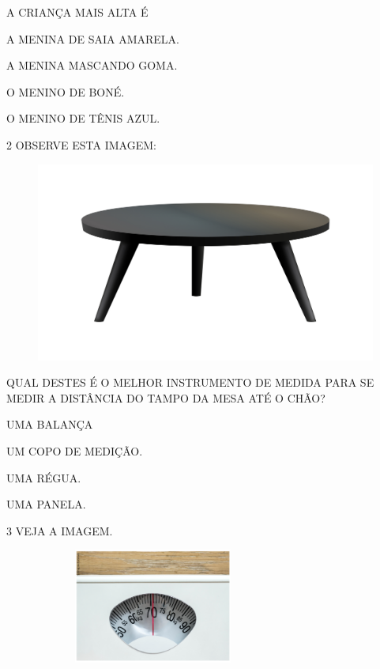 A CRIANÇA MAIS ALTA É

\begin{escolha}
\item A MENINA DE SAIA AMARELA.

\item A MENINA MASCANDO GOMA.

\item O MENINO DE BONÉ.

\item O MENINO DE TÊNIS AZUL.
\end{escolha}

\pagebreak
\num{2} OBSERVE ESTA IMAGEM:

\begin{figure}[htpb!]
\centering
\includegraphics[width=.4\textwidth]{media/image32b.jpg}
\end{figure}

QUAL DESTES É O MELHOR INSTRUMENTO DE MEDIDA PARA SE MEDIR A DISTÂNCIA DO TAMPO DA MESA ATÉ O CHÃO?

\begin{escolha}
\item UMA BALANÇA

\item UM COPO DE MEDIÇÃO.

\item UMA RÉGUA.

\item UMA PANELA.
\end{escolha}

\num{3} VEJA A IMAGEM.


\begin{figure}[htpb!]
\centering
\includegraphics[width=3.03770in,height=1.48580in]{./media/SAEB_1ANO_MAT_FIGURA44.png}
\end{figure}

